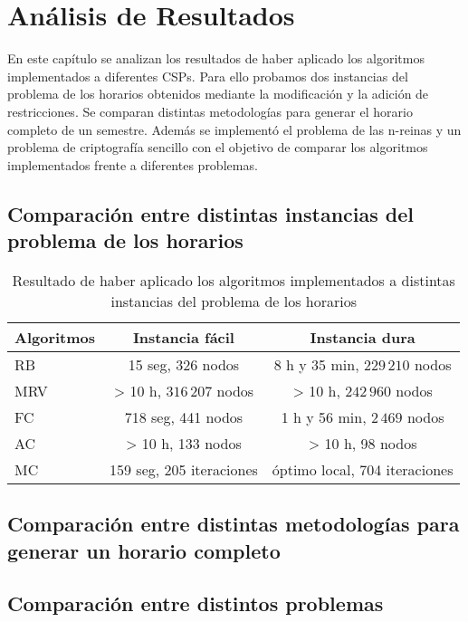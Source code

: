 \chapter{An\'alisis de Resultados}

En este cap\'itulo se analizan los resultados de haber aplicado los algoritmos implementados a diferentes CSPs. Para ello probamos dos instancias del problema de los horarios obtenidos mediante la modificaci\'on y la adici\'on de restricciones. Se comparan distintas metodolog\'ias para generar el horario completo de un semestre. Adem\'as se implement\'o el problema de las n-reinas y un problema de criptograf\'ia sencillo con el objetivo de comparar los algoritmos implementados frente a diferentes problemas.

\section{Comparaci\'on entre distintas instancias del problema de los horarios}

\begin{table}[h]
	\caption{Resultado de haber aplicado los algoritmos implementados a distintas instancias del problema de los horarios}
	\begin{center}
		\label{1semana}
		\begin{tabular}{l|c|c}
			Algoritmos & Instancia f\'acil & Instancia dura \\ \hline
			RB & 15 seg, 326 nodos & 8 h y 35 min, $229\,210$ nodos\\
			MRV & > 10 h, $316\,207$ nodos &  > 10 h, $242\,960$ nodos\\
			FC & 718 seg, 441 nodos & 1 h y 56 min, $2\,469$ nodos \\
			AC & > 10 h, 133 nodos &  > 10 h, 98 nodos \\
			MC & 159 seg, 205 iteraciones & \'optimo local, 704 iteraciones
		\end{tabular}
	\end{center}
\end{table}

\section{Comparaci\'on entre distintas metodolog\'ias para generar un horario completo}

\section{Comparaci\'on entre distintos problemas}